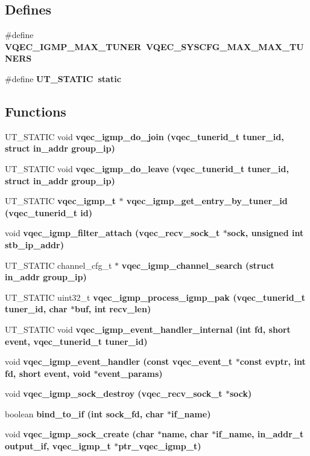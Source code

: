 \subsection*{Defines}
\begin{CompactItemize}
\item 
\#define \bf{VQEC\_\-IGMP\_\-MAX\_\-TUNER}~VQEC\_\-SYSCFG\_\-MAX\_\-MAX\_\-TUNERS
\item 
\#define \bf{UT\_\-STATIC}~static
\end{CompactItemize}
\subsection*{Functions}
\begin{CompactItemize}
\item 
UT\_\-STATIC void \bf{vqec\_\-igmp\_\-do\_\-join} (vqec\_\-tunerid\_\-t tuner\_\-id, struct in\_\-addr group\_\-ip)
\item 
UT\_\-STATIC void \bf{vqec\_\-igmp\_\-do\_\-leave} (vqec\_\-tunerid\_\-t tuner\_\-id, struct in\_\-addr group\_\-ip)
\item 
UT\_\-STATIC \bf{vqec\_\-igmp\_\-t} $\ast$ \bf{vqec\_\-igmp\_\-get\_\-entry\_\-by\_\-tuner\_\-id} (vqec\_\-tunerid\_\-t id)
\item 
void \bf{vqec\_\-igmp\_\-filter\_\-attach} (vqec\_\-recv\_\-sock\_\-t $\ast$sock, unsigned int stb\_\-ip\_\-addr)
\item 
UT\_\-STATIC channel\_\-cfg\_\-t $\ast$ \bf{vqec\_\-igmp\_\-channel\_\-search} (struct in\_\-addr group\_\-ip)
\item 
UT\_\-STATIC uint32\_\-t \bf{vqec\_\-igmp\_\-process\_\-igmp\_\-pak} (vqec\_\-tunerid\_\-t tuner\_\-id, char $\ast$buf, int recv\_\-len)
\item 
UT\_\-STATIC void \bf{vqec\_\-igmp\_\-event\_\-handler\_\-internal} (int fd, short event, vqec\_\-tunerid\_\-t tuner\_\-id)
\item 
void \bf{vqec\_\-igmp\_\-event\_\-handler} (const vqec\_\-event\_\-t $\ast$const evptr, int fd, short event, void $\ast$event\_\-params)
\item 
void \bf{vqec\_\-igmp\_\-sock\_\-destroy} (vqec\_\-recv\_\-sock\_\-t $\ast$sock)
\item 
boolean \bf{bind\_\-to\_\-if} (int sock\_\-fd, char $\ast$if\_\-name)
\item 
void \bf{vqec\_\-igmp\_\-sock\_\-create} (char $\ast$name, char $\ast$if\_\-name, in\_\-addr\_\-t output\_\-if, \bf{vqec\_\-igmp\_\-t} $\ast$ptr\_\-vqec\_\-igmp\_\-t)
\item 

\end{CompactItemize}
